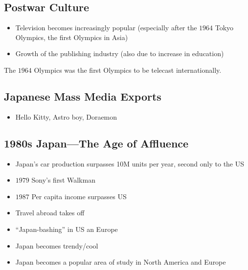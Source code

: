 \documentclass[class=article, crop=false]{standalone}
\begin{document}
  \subsection{Postwar Culture}
  \begin{itemize}
    \item Television becomes increasingly popular (especially after the $1964$ Tokyo Olympics, the first Olympics in Asia)
    \item Growth of the publishing industry (also due to increase in education)
  \end{itemize}
  \begin{note}{}
    The $1964$ Olympics was the first Olympics to be telecast internationally.
  \end{note}
  \subsection{Japanese Mass Media Exports}
  \begin{itemize}
    \item Hello Kitty, Astro boy, Doraemon
  \end{itemize}
  \subsection{1980s Japan---The Age of Affluence}
  \begin{itemize}
    \item Japan's car production surpasses 10M units per year, second only to the US
    \item $1979$ Sony's first Walkman
    \item $1987$ Per capita income surpasses US
    \item Travel abroad takes off
    \item ``Japan-bashing'' in US an Europe
    \item Japan becomes trendy/cool
    \item Japan becomes a popular area of study in North America and Europe
  \end{itemize}
\end{document}
